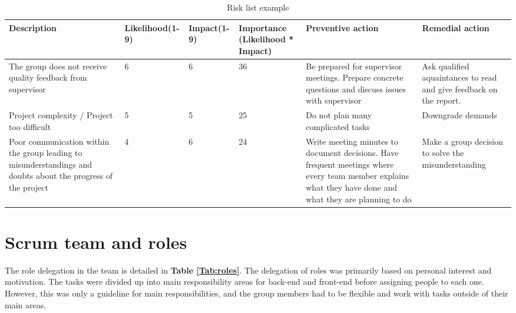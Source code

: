 \begin{center}
	\begin{longtable}{ | p{3.5cm} | p{2cm} | p{1.5cm} | p{2cm} | p{3.5cm} | p{3.5cm}|}
		
		\caption[Risk list example]{Risk list example } \label{Tab:riskexample}\\
		\hline
		\textbf{Description} & \textbf{Likelihood(1-9)} & \textbf{Impact(1-9)} & \textbf{Importance (Likelihood * Impact)} & \textbf{Preventive action} & \textbf{Remedial action}\\ \hline
		
		The group does not receive quality feedback from supervisor & 6 & 6 & 36 & Be prepared for supervisor meetings. Prepare concrete questions and discuss issues with supervisor & Ask qualified aquaintances to read and give feedback on the report. \\ \hline
		
		Project complexity / Project too difficult & 5 & 5 & 25 & Do not plan many complicated tasks & Downgrade demands \\ \hline  
		
		Poor communication within the group leading to misunderstandings and doubts about the progress of the project & 4 & 6 & 24 & Write meeting minutes to document decisions. Have frequent meetings where every team member explains what they have done and what they are planning to do & Make a group decision to solve the misunderstanding \\ \hline

	\end{longtable}
\end{center}


\section{Scrum team and roles}
\label{sec:scrum_team_and_roles}

The role delegation in the team is detailed in \textbf{Table \ref{Tab:roles}}. The delegation of roles was primarily based on personal interest and motivation. The tasks were divided up into main responsibility areas for back-end and front-end before assigning people to each one. However, this was only a guideline for main responsibilities, and the group members had to be flexible and work with tasks outside of their main areas.

